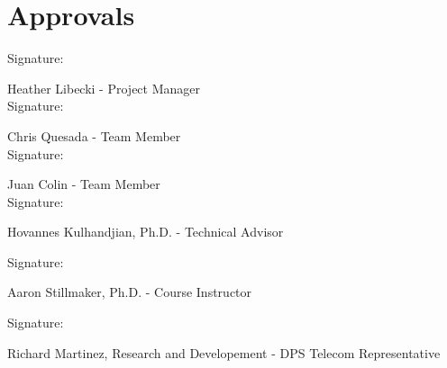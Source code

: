 \section{Approvals}
\setlength{\parindent}{15ex}
\vspace{0.5in}
	\begin{flushleft}
	Signature: \hrulefill
	
	\hspace*{0mm}\phantom{Approved: }Heather Libecki - Project Manager\\
	\vspace{12pt}
	Signature: \hrulefill
	
	\hspace*{0mm}\phantom{Approved: }Chris Quesada - Team Member\\
	\vspace{12pt}
	Signature: \hrulefill
	
	\hspace*{0mm}\phantom{Approved: }Juan Colin - Team Member\\
	\vspace{12pt}
	Signature: \hrulefill
	
	\hspace*{0mm}\phantom{Approved: }Hovannes Kulhandjian, Ph.D. -
	 Technical Advisor\\
	 \vspace{12pt}
	 
	 Signature: \hrulefill
	 
	 \hspace*{0mm}\phantom{Approved: }Aaron Stillmaker, Ph.D. -
	 Course Instructor\\
	 \vspace{12pt}
	 
	 Signature: \hrulefill
	 
	 \hspace*{0mm}\phantom{Approved: }Richard Martinez, Research and Developement - DPS Telecom Representative\\
	 \vspace{12pt}

\end{flushleft}\par
\newpage


	
		
 

